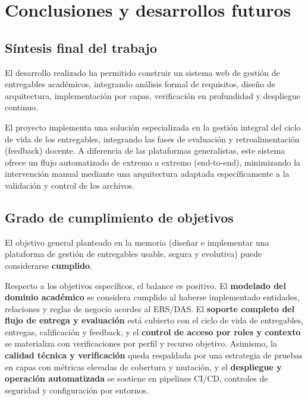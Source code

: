 \chapter{Conclusiones y desarrollos futuros}\label{conclusiones}
\makeatletter
{}
\makeatother

\FloatBarrier
\section{S\'intesis final del trabajo}

El desarrollo realizado ha permitido construir un sistema web de gesti\'on de
entregables acad\'emicos,
integrando an\'alisis formal de requisitos, dise\~no de arquitectura,
implementaci\'on por capas, verificaci\'on en profundidad y despliegue continuo.

El proyecto implementa una soluci\'on especializada en la gesti\'on integral del ciclo de vida de los entregables, integrando las fases de evaluaci\'on y retroalimentaci\'on (feedback) docente. A diferencia de las plataformas generalistas, este sistema ofrece un flujo automatizado de extremo a extremo (end-to-end), minimizando la intervenci\'on manual mediante una arquitectura adaptada espec\'ificamente a la validaci\'on y control de los archivos.

\FloatBarrier
\section{Grado de cumplimiento de objetivos}

El objetivo general planteado en la memoria
(dise\~nar e implementar una plataforma de gesti\'on de entregables usable,
segura y evolutiva) puede considerarse \textbf{cumplido}.

Respecto a los objetivos espec\'ificos, el balance es positivo. El \textbf{modelado del dominio acad\'emico} se considera cumplido al haberse implementado entidades, relaciones y reglas de negocio acordes al ERS/DAS. El \textbf{soporte completo del flujo de entrega y evaluaci\'on} est\'a cubierto con el ciclo de vida de entregables, entregas, calificaci\'on y feedback, y el \textbf{control de acceso por roles y contexto} se materializa con verificaciones por perfil y recurso objetivo. Asimismo, la \textbf{calidad t\'ecnica y verificaci\'on} queda respaldada por una estrategia de pruebas en capas con m\'etricas elevadas de cobertura y mutaci\'on, y el \textbf{despliegue y operaci\'on automatizada} se sostiene en pipelines CI/CD, controles de seguridad y configuraci\'on por entornos.

